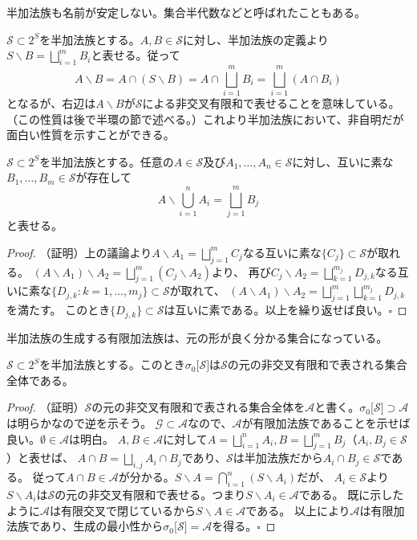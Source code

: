 \documentclass[../root.tex]{subfiles}
\begin{document}
半加法族も名前が安定しない。集合半代数などと呼ばれたこともある。

$ \mathscr{S}\subset 2^{S} $を半加法族とする。$ A, B\in\mathscr{S} $に対し、半加法族の定義より$ S\backslash B=\bigsqcup_{i=1}^{m}B_{i} $と表せる。従って
\[ A\backslash B=A\cap( S\backslash B )=A\cap\bigsqcup_{i=1}^{m}B_{i}=\bigsqcup_{i=1}^{m}( A\cap B_{i} ) \]
となるが、右辺は$ A\backslash B $が$ \mathscr{S} $による非交叉有限和で表せることを意味している。（この性質は後で半環の節で述べる。）これより半加法族において、非自明だが面白い性質を示すことができる。

\begin{Lem}{}{}
$ \mathscr{S}\subset 2^{S} $を半加法族とする。任意の$ A\in\mathscr{S} $及び$ A_{1}, \dotsc, A_{n}\in\mathscr{S} $に対し、互いに素な$ B_{1}, \dotsc, B_{m}\in\mathscr{S} $が存在して
\[ A\backslash\bigcup_{i=1}^{n}A_{i}=\bigsqcup_{j=1}^{m}B_{j} \]
と表せる。
\end{Lem}

\begin{proof}
（証明）上の議論より$ A\backslash A_{1}=\bigsqcup_{j=1}^{m}C_{j} $なる互いに素な$ \lbrace C_{j} \rbrace\subset\mathscr{S} $が取れる。
$ ( A\backslash A_{1} )\backslash A_{2} = \bigsqcup_{j=1}^{m}( C_{j}\backslash A_{2} ) $より、
再び$ C_{j}\backslash A_{2}=\bigsqcup_{k=1}^{m_{j}}D_{j, k} $なる互いに素な$ \lbrace D_{j, k} : k=1, \dotsc, m_{j} \rbrace\subset\mathscr{S} $が取れて、
$ ( A\backslash A_{1} )\backslash A_{2} = \bigsqcup_{j=1}^{m}\bigsqcup_{k=1}^{m_{j}}D_{j, k} $を満たす。
このとき$ \lbrace D_{j, k} \rbrace\subset\mathscr{S} $は互いに素である。以上を繰り返せば良い。$ \square $
\end{proof}

半加法族の生成する有限加法族は、元の形が良く分かる集合になっている。

\begin{Prop}{}{}
$ \mathscr{S}\subset 2^{S} $を半加法族とする。このとき$ \sigma_{0}\lbrack \mathscr{S} \rbrack $は$ \mathscr{S} $の元の非交叉有限和で表される集合全体である。
\end{Prop}

\begin{proof}
（証明）$ \mathscr{S} $の元の非交叉有限和で表される集合全体を$ \mathscr{A} $と書く。$ \sigma_{0}\lbrack \mathscr{S} \rbrack\supset\mathscr{A} $は明らかなので逆を示そう。
$ \mathscr{G}\subset\mathscr{A} $なので、$ \mathscr{A} $が有限加法族であることを示せば良い。$ \emptyset\in\mathscr{A} $は明白。
$ A, B\in\mathscr{A} $に対して$ A=\bigsqcup_{i=1}^{n}A_{i}, B=\bigsqcup_{j=1}^{m}B_{j} $（$ A_{i}, B_{j}\in\mathscr{S} $）と表せば、
$ A\cap B=\bigsqcup_{i, j}A_{i}\cap B_{j} $であり、$ \mathscr{S} $は半加法族だから$ A_{i}\cap B_{j}\in\mathscr{S} $である。
従って$ A\cap B\in\mathscr{A} $が分かる。$ S\backslash A=\bigcap_{i=1}^{n}( S\backslash A_{i} ) $だが、
$ A_{i}\in\mathscr{S} $より$ S\backslash A_{i} $は$ \mathscr{S} $の元の非交叉有限和で表せる。つまり$ S\backslash A_{i}\in\mathscr{A} $である。
既に示したように$ \mathscr{A} $は有限交叉で閉じているから$ S\backslash A\in\mathscr{A} $である。
以上により$ \mathscr{A} $は有限加法族であり、生成の最小性から$ \sigma_{0}\lbrack \mathscr{S} \rbrack=\mathscr{A} $を得る。$ \square $
\end{proof}
\end{document}

